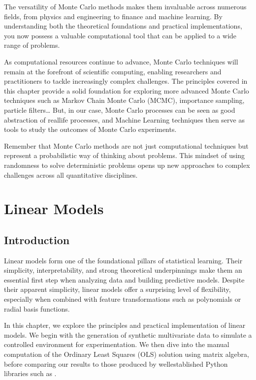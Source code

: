 \documentclass[letterpaper,10pt,english]{jupyterBook}
\begin{document}
\sphinxAtStartPar
The versatility of Monte Carlo methods makes them invaluable across numerous fields, from physics and engineering to finance and machine learning. By understanding both the theoretical foundations and practical implementations, you now possess a valuable computational tool that can be applied to a wide range of problems.

\sphinxAtStartPar
As computational resources continue to advance, Monte Carlo techniques will remain at the forefront of scientific computing, enabling researchers and practitioners to tackle increasingly complex challenges. The principles covered in this chapter provide a solid foundation for exploring more advanced Monte Carlo techniques such as Markov Chain Monte Carlo (MCMC), importance sampling, particle filters… But, in our case, Monte Carlo processes can be seen as good abstraction of real\sphinxhyphen{}life processes, and Machine Learning techniques then serve as tools to study the outcomes of Monte Carlo experiments.

\sphinxAtStartPar
Remember that Monte Carlo methods are not just computational techniques but represent a probabilistic way of thinking about problems. This mindset of using randomness to solve deterministic problems opens up new approaches to complex challenges across all quantitative disciplines.

\sphinxstepscope


\chapter{Linear Models}
\label{\detokenize{02:linear-models}}\label{\detokenize{02::doc}}

\section{Introduction}
\label{\detokenize{02:introduction}}
\sphinxAtStartPar
Linear models form one of the foundational pillars of statistical learning. Their simplicity, interpretability, and strong theoretical underpinnings make them an essential first step when analyzing data and building predictive models. Despite their apparent simplicity, linear models offer a surprising level of flexibility, especially when combined with feature transformations such as polynomials or radial basis functions.

\sphinxAtStartPar
In this chapter, we explore the principles and practical implementation of linear models. We begin with the generation of synthetic multivariate data to simulate a controlled environment for experimentation. We then dive into the manual computation of the Ordinary Least Squares (OLS) solution using matrix algebra, before comparing our results to those produced by well\sphinxhyphen{}established Python libraries such as .
\end{document}
